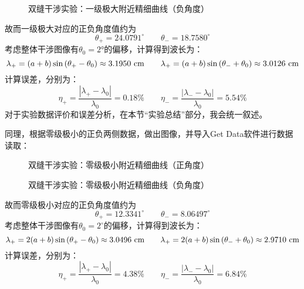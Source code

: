 \documentclass[11pt]{article}
\begin{document}
\begin{figure}[H]
    \centering
    \hspace{0.5cm}
    \caption{双缝干涉实验：一级极大附近精细曲线（负角度）}
\end{figure}

故而一级极大对应的正负角度值约为
\[
   \theta_+=24.0791^{\circ}\qquad\theta_{-}=18.7580^{\circ} 
\]
考虑整体干涉图像有$\theta_0=2°$的偏移，计算得到波长为：
\[
   \lambda_+=(a+b)\sin {(\theta_+-\theta_0)}\approx 3.1950\,\,{\rm cm}\qquad 
   \lambda_+=(a+b)\sin {(\theta_{-}+\theta_0)}\approx 3.0126\,\,{\rm cm}
\]
计算误差，分别为：
\begin{displaymath}
    \eta_+=\frac{|\lambda_+-\lambda_0|}{\lambda_0}=0.18\%\qquad
    \eta_{-}=\frac{|\lambda_{-}-\lambda_0|}{\lambda_0}=5.54\%
\end{displaymath}
对于实验数据评价和误差分析，在本节“实验总结”部分，我会统一叙述。

\bigskip
同理，根据零级极小的正负两侧数据，做出图像，并导入Get Data软件进行数据读取：

\begin{figure}[H]
    \centering
    \hspace{0.5cm}
    \caption{双缝干涉实验：零级极小附近精细曲线（正角度）}
\end{figure}

\begin{figure}[H]
    \centering
    \hspace{0.5cm}
    \caption{双缝干涉实验：零级极小附近精细曲线（负角度）}
\end{figure}


故而零级极小对应的正负角度值约为
\[
   \theta_+=12.3341^{\circ} \qquad\theta_{-}=8.06497^{\circ} 
\]
考虑整体干涉图像有$\theta_0=2^{\circ}$的偏移，计算得到波长为：
\[
   \lambda_+=2(a+b)\sin {(\theta_+-\theta_0)}\approx 3.0496\,\,{\rm cm}\qquad 
   \lambda_+=2(a+b)\sin {(\theta_{-}+\theta_0)}\approx 2.9710\,\,{\rm cm}
\]
计算误差，分别为：
\begin{displaymath}
    \eta_+=\frac{|\lambda_+-\lambda_0|}{\lambda_0}=4.38\%\qquad
    \eta_{-}=\frac{|\lambda_{-}-\lambda_0|}{\lambda_0}=6.84\%
\end{displaymath}
\end{document}
